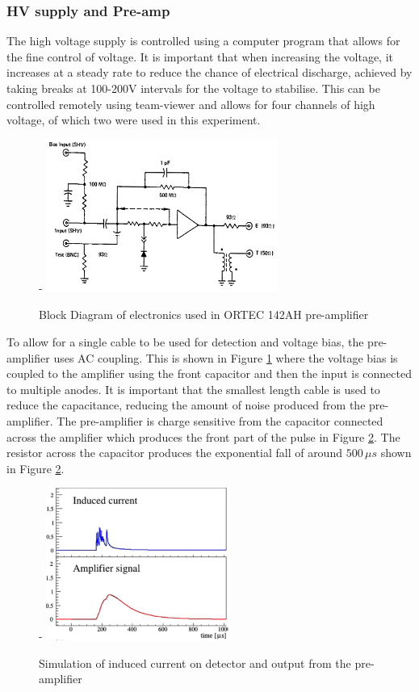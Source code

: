 \documentclass[a4paper]{article}
\begin{document}
\subsubsection{HV supply and Pre-amp}
The high voltage supply is controlled using a computer program that allows for the fine control of voltage. It is important that when increasing the voltage, it increases at a steady rate to reduce the chance of electrical discharge, achieved by taking breaks at 100-200V intervals for the voltage to stabilise. This can be controlled remotely using team-viewer and allows for four channels of high voltage, of which two were used in this experiment.
\begin{figure}[H]-
    \centering
    \includegraphics[height=5cm]{plots/amp.png}
    \caption{Block Diagram of electronics used in ORTEC 142AH pre-amplifier \cite{ortec}}
    \label{fig:amp}
\end{figure}
\noindent To allow for a single cable to be used for detection and voltage bias, the pre-amplifier uses AC coupling. This is shown in Figure \ref{fig:amp} where the voltage bias is coupled to the amplifier using the front capacitor and then the input is connected to multiple anodes. It is important that the smallest length cable is used to reduce the capacitance, reducing the amount of noise produced from the pre-amplifier. The pre-amplifier is charge sensitive from the capacitor connected across the amplifier which produces the front part of the pulse in Figure \ref{fig:amplifier}. The resistor across the capacitor produces the exponential fall of around $500\,\mu s$ \cite{ortec_web} shown in Figure \ref{fig:amplifier}. 
\begin{figure}[H]-
    \centering
    \includegraphics[height=5cm]{plots/amplifier.png}
    \caption{Simulation of induced current on detector and output from the pre-amplifier \cite{news_2020}}
    \label{fig:amplifier}
\end{figure}
\end{document}
